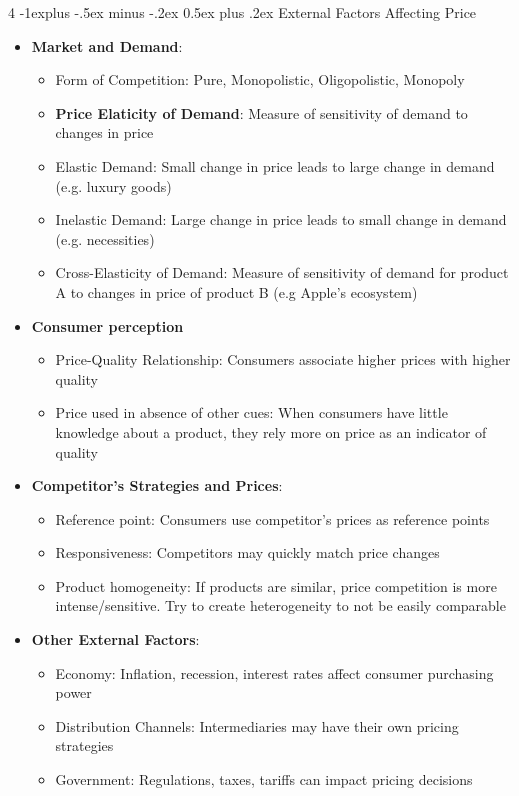 \documentclass[10pt, landscape]{article}
\makeatletter
\renewcommand{\subsection}{\@startsection{subsection}{2}{0mm}%
  {-1explus -.5ex minus -.2ex}%
  {0.5ex plus .2ex}%
{\normalfont\normalsize\bfseries}}
\makeatother
\begin{document}
\begin{multicols*}{4}
  \subsection{External Factors Affecting Price}
  \begin{itemize}
    \item \textbf{Market and Demand}:
    \begin{itemize}
      \item Form of Competition: Pure, Monopolistic, Oligopolistic, Monopoly
      \item \textbf{Price Elaticity of Demand}: Measure of sensitivity of demand to changes in price
      \item Elastic Demand: Small change in price leads to large change in demand (e.g. luxury goods)
      \item Inelastic Demand: Large change in price leads to small change in demand (e.g. necessities)
      \item Cross-Elasticity of Demand: Measure of sensitivity of demand for product A to changes in price of product B (e.g Apple's ecosystem)
    \end{itemize}
    \item \textbf{Consumer perception}
      \begin{itemize}
        \item Price-Quality Relationship: Consumers associate higher prices with higher quality
        \item Price used in absence of other cues: When consumers have little knowledge about a product, they rely more on price as an indicator of quality
      \end{itemize}
    \item \textbf{Competitor's Strategies and Prices}:
    \begin{itemize}
      \item Reference point: Consumers use competitor's prices as reference points
      \item Responsiveness: Competitors may quickly match price changes
      \item Product homogeneity: If products are similar, price competition is more intense/sensitive. Try to create heterogeneity to not be easily comparable
    \end{itemize}
    \item \textbf{Other External Factors}:
    \begin{itemize}
      \item Economy: Inflation, recession, interest rates affect consumer purchasing power
      \item Distribution Channels: Intermediaries may have their own pricing strategies
      \item Government: Regulations, taxes, tariffs can impact pricing decisions
    \end{itemize}
  \end{itemize}


\end{multicols*}
\end{document}
